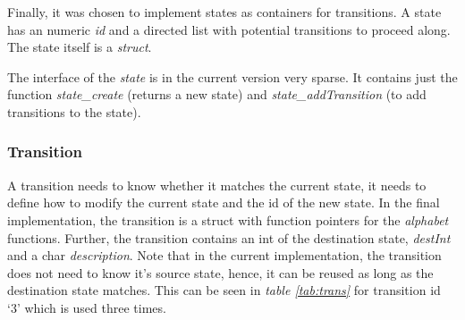 \documentclass[a4paper,11pt,twoside]{article}
\begin{document}
Finally, it was chosen to implement states as containers for
transitions. A state has an numeric \textit{id} and a directed list
with potential transitions to proceed along. The state itself is a
\textit{struct}.

The interface of the \textit{state} is in the current version very
sparse. It contains just the function \textit{state\_create} (returns a
new state) and \textit{state\_addTransition} (to add transitions to the
state). 


\subsubsection{Transition}
A transition needs to know whether it matches the current
state, it needs to define how to modify the current state and the id
of the new state. In the final implementation, the transition is a
struct with function pointers for the \textit{alphabet}
functions. Further, the transition contains an int of the destination
state, \textit{destInt} and a char \textit{description}. Note that in
the current implementation, the transition does not need to know it's
source state, hence, it can be reused as long as the destination state
matches. This can be seen in \textit{table \ref{tab:trans}} for
transition id `3' which is used three times.  
  
\end{document}

